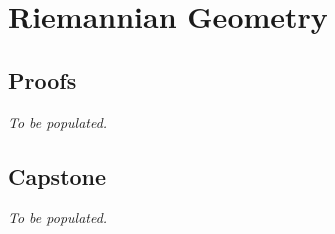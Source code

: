 \chapter{Riemannian Geometry}

\clearpage

\clearpage

\section*{Proofs}
\textit{To be populated.}

\section*{Capstone}
\textit{To be populated.}
